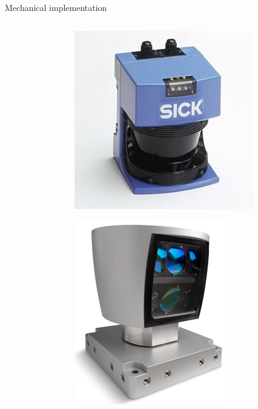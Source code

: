 \documentclass[compress]{beamer}
\begin{document}
\begin{frame}{Mechanical implementation}
\begin{columns}
\begin{column}{0.5\linewidth}
\begin{tikzpicture}
            \end{tikzpicture}

        \end{column}
        \begin{column}{0.5\linewidth}

            \begin{center}
                \includegraphics[width=0.6\linewidth]{SICK_LMS200}

                \includegraphics[width=0.6\linewidth]{velodyne}
            \end{center}
        \end{column}
    \end{columns}

\end{frame}
\end{document}
